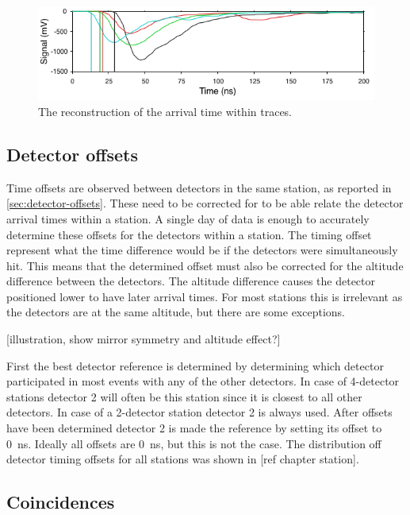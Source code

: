 \begin{figure}
    \centering
    \includegraphics[width=0.7\linewidth]{plots/processing/arrival_time.png}
    \caption{The reconstruction of the arrival time within traces.}
    \label{fig:arrival_time}
\end{figure}


\subsection{Detector offsets}

Time offsets are observed between detectors in the same station, as reported in \cref{sec:detector-offsets}. These need to be corrected for to be able relate the detector arrival  times within a station. A single day of data is enough to accurately determine these offsets for the detectors within a station. The timing offset represent what the time difference would be if the detectors were simultaneously hit. This means that the determined offset must also be corrected for the altitude difference between the detectors. The altitude difference causes the detector positioned lower to have later arrival times. For most stations this is irrelevant as the detectors are at the same altitude, but there are some exceptions.

[illustration, show mirror symmetry and altitude effect?]

First the best detector reference is determined by determining which detector participated in most events with any of the other detectors. In case of 4-detector stations detector 2 will often be this station since it is closest to all other detectors. In case of a 2-detector station detector 2 is always used. After offsets have been determined detector 2 is made the reference by setting its offset to \SI{0}{\ns}. Ideally all offsets are \SI{0}{\ns}, but this is not the case. The distribution off detector timing offsets for all \hisparc stations was shown in [ref chapter station].


\subsection{Coincidences}


